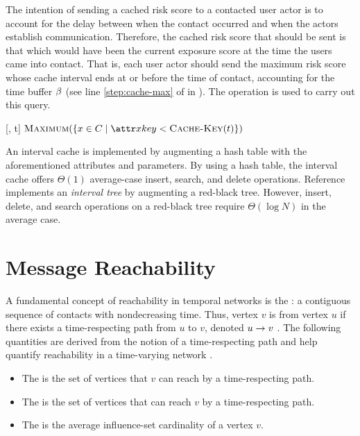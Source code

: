 The intention of sending a cached risk score to a contacted user actor is to account for the delay between when the contact occurred and when the actors establish communication. Therefore, the cached risk score that should be sent is that which would have been the current exposure score at the time the users came into contact. That is, each user actor should send the maximum risk score whose cache interval ends at or before the time of contact, accounting for the time buffer $\beta$ (see line \ref{step:cache-max} of \cSendCurrentOrCached in ). The operation \cCacheMax is used to carry out this query.
%
\begin{function}{\nCacheMax}[\vCache, t]
    \State \Return $\cMaximum[\{\vCacheItem \in \vCache \mid \aCacheItemKey < \cCacheKey[t]\}]$
\end{function}

An interval cache is implemented by augmenting a hash table \cite[pp. 253--285]{Cormen2009} with the aforementioned attributes and parameters. By using a hash table, the interval cache offers $\Theta(1)$ average-case insert, search, and delete operations. Reference \cite[pp. 348--354]{Cormen2009} implements an \emph{interval tree} by augmenting a red-black tree. However, insert, delete, and search operations on a red-black tree require $\Theta(\log N)$ in the average case.

\section{Message Reachability}\label{sec:reachability}
A fundamental concept of reachability in temporal networks is the : a contiguous sequence of contacts with nondecreasing time. Thus, vertex $v$ is  from vertex $u$ if there exists a time-respecting path from $u$ to $v$, denoted $u \rightarrow v$ \cite{Moody2002}. The following quantities are derived from the notion of a time-respecting path and help quantify reachability in a time-varying network \cite{Holme2012}.
%
\begin{itemize}
    \item The  is the set of vertices that $v$ can reach by a time-respecting path.
    \item The  is the set of vertices that can reach $v$ by a time-respecting path.
    \item The  is the average influence-set cardinality of a vertex $v$.
\end{itemize}


